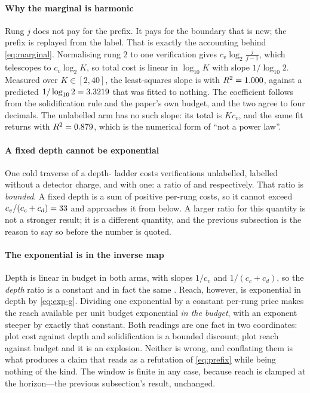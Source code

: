 \documentclass[conference]{IEEEtran}
\theoremstyle{definition}
\begin{document}
\paragraph{Why the marginal is harmonic} Rung $j$ does not pay for the prefix. It pays
for the boundary that is new; the prefix is replayed from the label. That is exactly
the accounting behind \eqref{eq:marginal}. Normalising rung $2$ to one verification
gives $c_v\log_2\!\frac{j}{j-1}$, which telescopes to $c_v\log_2 K$, so total cost is
linear in $\log_{10}K$ with slope $1/\log_{10}2$. Measured over $K\in[2,40]$, the
least-squares slope is \sdSlopeBudget{} with $R^2=1.000$, against a
predicted $1/\log_{10}2=3.3219$ that was fitted to nothing. The coefficient
follows from the solidification rule and the paper's own budget, and the two agree to
four decimals. The unlabelled arm has no such slope: its total is $Kc_v$, and the same
fit returns \sdSlopeUnlabelled{} with $R^2=0.879$, which is the
numerical form of ``not a power law''.

\paragraph{A fixed depth cannot be exponential} One cold traverse of a depth-\sdDepth{}
ladder costs \sdColdUnlabelled{} verifications unlabelled, \sdColdPure{} labelled
without a detector charge, and \sdColdLabelled{} with one: a ratio of
\sdColdPureRatio{} and \sdColdRatio{} respectively. That ratio is \emph{bounded}. A
fixed depth is a sum of positive per-rung costs, so it cannot exceed
$c_v/(c_c+c_d)=33$ and approaches it from below. A larger ratio for this
quantity is not a stronger result; it is a different quantity, and the previous
subsection is the reason to say so before the number is quoted.

\paragraph{The exponential is in the inverse map} Depth is linear in budget in both
arms, with slopes $1/c_v$ and $1/(c_c+c_d)$, so the \emph{depth} ratio is a constant
and in fact the same \sdBound{}. Reach, however, is exponential in depth by
\eqref{eq:exp-g}. Dividing one exponential by a constant per-rung price makes the
reach available per unit budget exponential \emph{in the budget}, with an exponent
steeper by exactly that constant. Both readings are one fact in two coordinates:
plot cost against depth and solidification is a bounded discount; plot reach against
budget and it is an explosion. Neither is wrong, and conflating them is what produces
a claim that reads as a refutation of \eqref{eq:prefix} while being nothing of the
kind. The window is finite in any case, because reach is clamped at the horizon---the
previous subsection's result, unchanged.
\end{document}
